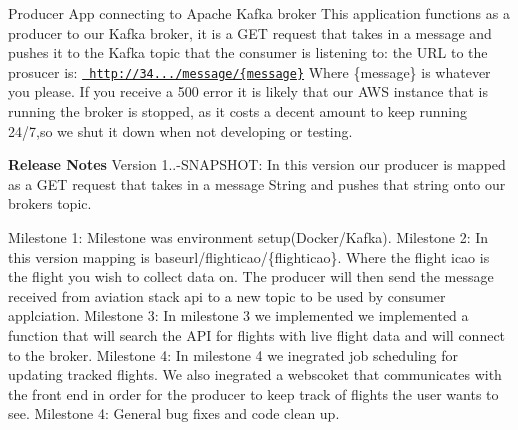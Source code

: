 Producer App connecting to Apache Kafka broker This application functions as a producer to our Kafka broker, it is a GET request that takes in a message and pushes it to the Kafka topic that the consumer is listening to\+: the URL to the prosucer is\+: \href{http://34.198.166.4/message/{message}}{\texttt{ http\+://34.../message/\{message\}}} Where \textquotesingle{}\{message\}\textquotesingle{} is whatever you please. If you receive a 500 error it is likely that our AWS instance that is running the broker is stopped, as it costs a decent amount to keep running 24/7,so we shut it down when not developing or testing.

{\bfseries{Release Notes}} Version 1..-\/SNAPSHOT\+: In this version our producer is mapped as a GET request that takes in a message String and pushes that string onto our broker\textquotesingle{}s topic.

Milestone 1\+: Milestone was environment setup(Docker/\+Kafka). Milestone 2\+: In this version mapping is baseurl/flighticao/\{flighticao\}. Where the flight icao is the flight you wish to collect data on. The producer will then send the message received from aviation stack api to a new topic to be used by consumer applciation. Milestone 3\+: In milestone 3 we implemented we implemented a function that will search the API for flights with live flight data and will connect to the broker. Milestone 4\+: In milestone 4 we inegrated job scheduling for updating tracked flights. We also inegrated a webscoket that communicates with the front end in order for the producer to keep track of flights the user wants to see. Milestone 4\+: General bug fixes and code clean up. 